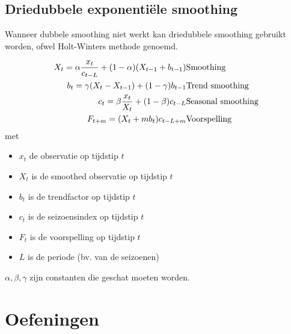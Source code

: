 \subsection{Driedubbele exponenti\"ele smoothing}
Wanneer dubbele smoothing niet werkt kan driedubbele smoothing gebruikt worden, ofwel Holt-Winters methode genoemd.

\begin{eqnarray}
	X_{t} = \alpha \frac{x_{t}}{c_{t-L}} + (1-\alpha) (X_{t-1} + b_{t-1}) & \textnormal{Smoothing}\\
	b_{t} = \gamma (X_{t} - X_{t-1}) + (1-\gamma)b_{t-1} & \textnormal{Trend smoothing} \\
	c_{t} = \beta \frac{x_{t}}{X_{t}} + (1-\beta)c_{t-L} & \textnormal{Seasonal smoothing} \\
	F_{t+m} = (X_{t} + mb_{t})c_{t-L+m} & \textnormal{Voorspelling}
\label{eq:HoltWinters}
\end{eqnarray}
 met 
\begin{itemize}
	\item $x_{t}$ de observatie op tijdstip $t$
	\item $X_{t}$ is de smoothed observatie op tijdstip $t$
	\item $b_{t}$ is de trendfactor op tijdstip $t$
	\item $c_{t}$ is de seizoensindex op tijdstip $t$
	\item $F_{t}$ is de voorspelling op tijdstip $t$
	\item $L$ is de periode (bv. van de seizoenen)
\end{itemize}

$\alpha, \beta, \gamma$ zijn constanten die geschat moeten worden. 


\section{Oefeningen}
\label{sec:steekproefonderzoek-oefeningen}

